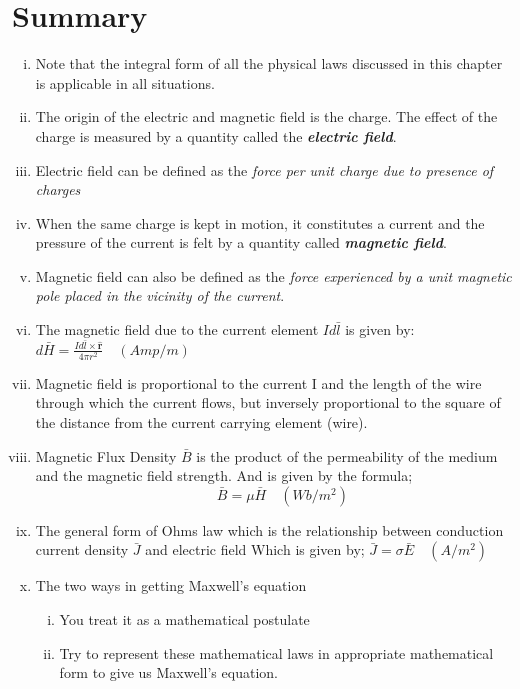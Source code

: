 \section{Summary}
\begin{enumerate}[(i)]
\item Note that the integral form of all the physical laws discussed in this chapter is applicable in all situations.

\item The origin of the electric and magnetic field is the charge. The effect of the charge is measured by a quantity called the \textbf{\emph{electric field}}.

\item Electric field can be defined as the \emph{force per unit charge due to presence of charges} 

\item When the same charge is kept in motion, it constitutes a current and the pressure of the current is felt by a quantity called \textbf{\emph{magnetic field}}.

\item Magnetic field can also be defined as the \emph{force experienced by a unit magnetic pole placed in the vicinity of the current}.

\item The magnetic field due to the current element $Id\bar{l}$ is given by:
$\boxed{d\bar{H}= \frac{Id\bar{l} \times \hat{\textbf{r}}}{4\pi r^{2}}}\quad (Amp/m)$ 

\item Magnetic field is proportional to the current I and the length of the wire through which the current flows, but inversely proportional to the square of the distance from the current carrying element (wire).

\item Magnetic Flux Density $\bar{B}$ is the product of the permeability of the medium and the magnetic field strength. And is given by the formula;
$$\quad\boxed{\bar{B} = \mu\bar{H}}\quad (Wb/m^{2})$$

\item The general form of Ohms law which is the relationship between conduction current density $\bar{J}$ and electric field Which is given by; $\boxed{\bar{J} = \sigma\bar{E}}\quad (A/m^{2})$

\item The two ways in getting Maxwell's equation
\begin{enumerate}[(i)]
\item	You treat it as a mathematical postulate
\item	Try to represent these mathematical laws in appropriate mathematical form to give us Maxwell's equation.
\end{enumerate}


\end{enumerate}
